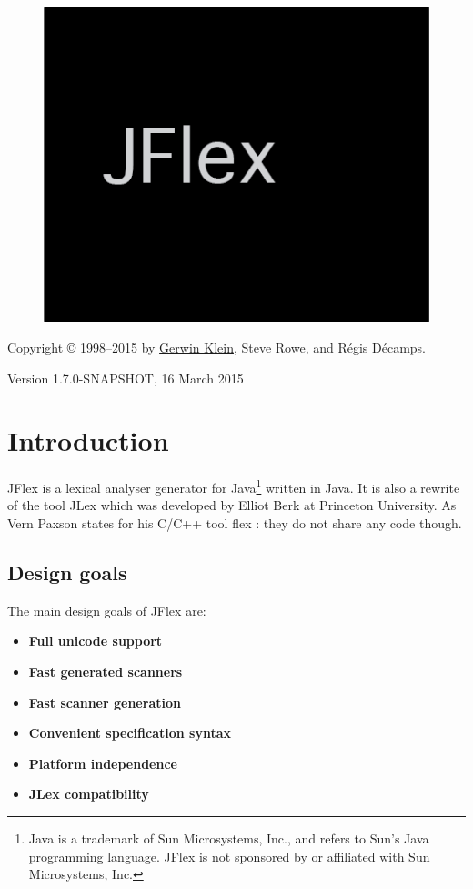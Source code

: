 \begin{figure}[htbp]
\centering
\includegraphics{jflex-black.png}
\caption{}
\end{figure}

Copyright © 1998--2015 by \href{http://www.doclsf.de}{Gerwin Klein},
Steve Rowe, and Régis Décamps.

Version 1.7.0-SNAPSHOT, 16 March 2015

\section{Introduction}\label{Intro}

JFlex is a lexical analyser generator for Java\footnote{Java is a
  trademark of Sun Microsystems, Inc., and refers to Sun's Java
  programming language. JFlex is not sponsored by or affiliated with Sun
  Microsystems, Inc.} written in Java. It is also a rewrite of the tool
JLex \autocite{JLex} which was developed by Elliot Berk at Princeton
University. As Vern Paxson states for his C/C++ tool flex
\autocite{flex}: they do not share any code though.

\subsection{Design goals}\label{design-goals}

The main design goals of JFlex are:

\begin{itemize}
\itemsep1pt\parskip0pt
\item
  \textbf{Full unicode support}
\item
  \textbf{Fast generated scanners}
\item
  \textbf{Fast scanner generation}
\item
  \textbf{Convenient specification syntax}
\item
  \textbf{Platform independence}
\item
  \textbf{JLex compatibility}
\end{itemize}

